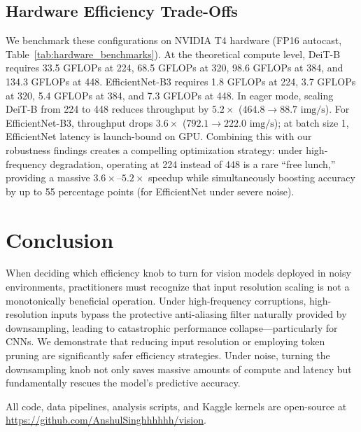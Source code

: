 \documentclass[10pt,twocolumn,letterpaper]{article}
\begin{document}


\subsection{Hardware Efficiency Trade-Offs}



We benchmark these configurations on NVIDIA T4 hardware (FP16 autocast, Table~\ref{tab:hardware_benchmarks}).
At the theoretical compute level, DeiT-B requires 33.5 GFLOPs at 224, 68.5 GFLOPs at 320, 98.6 GFLOPs at 384, and 134.3 GFLOPs at 448. EfficientNet-B3 requires 1.8 GFLOPs at 224, 3.7 GFLOPs at 320, 5.4 GFLOPs at 384, and 7.3 GFLOPs at 448. In eager mode, scaling DeiT-B from 224 to 448 reduces throughput by $5.2\times$ ($464.8 \to 88.7\text{ img/s}$). For EfficientNet-B3, throughput drops $3.6\times$ ($792.1 \to 222.0\text{ img/s}$); at batch size 1, EfficientNet latency is launch-bound on GPU. Combining this with our robustness findings creates a compelling optimization strategy: under high-frequency degradation, operating at 224 instead of 448 is a rare ``free lunch,'' providing a massive $3.6\times$--$5.2\times$ speedup while simultaneously boosting accuracy by up to 55 percentage points (for EfficientNet under severe noise).

\section{Conclusion}

When deciding which efficiency knob to turn for vision models deployed in noisy environments, practitioners must recognize that input resolution scaling is not a monotonically beneficial operation. Under high-frequency corruptions, high-resolution inputs bypass the protective anti-aliasing filter naturally provided by downsampling, leading to catastrophic performance collapse—particularly for CNNs. We demonstrate that reducing input resolution or employing token pruning are significantly safer efficiency strategies. Under noise, turning the downsampling knob not only saves massive amounts of compute and latency but fundamentally rescues the model's predictive accuracy.

All code, data pipelines, analysis scripts, and Kaggle kernels are open-source at \url{https://github.com/AnshulSinghhhhhh/vision}.
\end{document}

